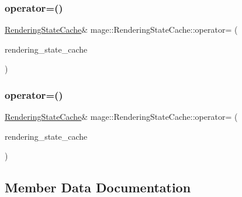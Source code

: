 \hypertarget{structmage_1_1_rendering_state_cache_a9534ceabde1d3f9f318f90d2ceec7646}{}\label{structmage_1_1_rendering_state_cache_a9534ceabde1d3f9f318f90d2ceec7646} 
\subsubsection{\texorpdfstring{operator=()}{operator=()}\hspace{0.1cm}{\footnotesize\ttfamily [1/2]}}
{\footnotesize\ttfamily \hyperlink{structmage_1_1_rendering_state_cache}{Rendering\+State\+Cache}\& mage\+::\+Rendering\+State\+Cache\+::operator= (\begin{DoxyParamCaption}\item[{const \hyperlink{structmage_1_1_rendering_state_cache}{Rendering\+State\+Cache} \&}]{rendering\+\_\+state\+\_\+cache }\end{DoxyParamCaption})\hspace{0.3cm}{\ttfamily [delete]}}

\hypertarget{structmage_1_1_rendering_state_cache_aac885d9a83e196299ac896b3847f471b}{}\label{structmage_1_1_rendering_state_cache_aac885d9a83e196299ac896b3847f471b} 
\subsubsection{\texorpdfstring{operator=()}{operator=()}\hspace{0.1cm}{\footnotesize\ttfamily [2/2]}}
{\footnotesize\ttfamily \hyperlink{structmage_1_1_rendering_state_cache}{Rendering\+State\+Cache}\& mage\+::\+Rendering\+State\+Cache\+::operator= (\begin{DoxyParamCaption}\item[{\hyperlink{structmage_1_1_rendering_state_cache}{Rendering\+State\+Cache} \&\&}]{rendering\+\_\+state\+\_\+cache }\end{DoxyParamCaption})\hspace{0.3cm}{\ttfamily [delete]}}



\subsection{Member Data Documentation}
\hypertarget{structmage_1_1_rendering_state_cache_ae29d186475c245d3eb5701005631c655}{}\label{structmage_1_1_rendering_state_cache_ae29d186475c245d3eb5701005631c655} 
